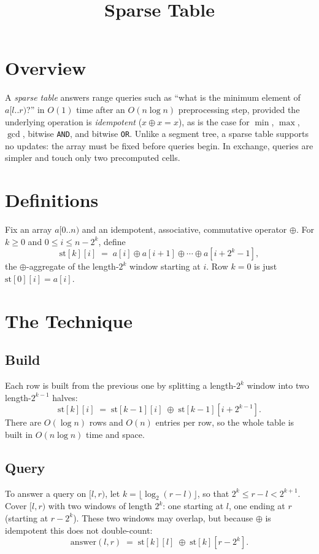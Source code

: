 \documentclass[11pt]{article}
\title{Sparse Table}
\author{}
\date{}
\begin{document}
\thispagestyle{fancy}


\section{Overview}
A \emph{sparse table} answers range queries such as ``what is the minimum
element of $a[l..r)$?'' in $O(1)$ time after an $O(n\log n)$ preprocessing
step, provided the underlying operation is \emph{idempotent}
($x \oplus x = x$), as is the case for $\min$, $\max$, $\gcd$, bitwise
\texttt{AND}, and bitwise \texttt{OR}. Unlike a segment tree, a sparse table
supports no updates: the array must be fixed before queries begin. In
exchange, queries are simpler and touch only two precomputed cells.

\section{Definitions}
\begin{definitionbox}
Fix an array $a[0..n)$ and an idempotent, associative, commutative operator
$\oplus$. For $k \ge 0$ and $0 \le i \le n - 2^k$, define
\[
  \mathrm{st}[k][i] \;=\; a[i] \oplus a[i+1] \oplus \cdots \oplus a[i+2^k-1],
\]
the $\oplus$-aggregate of the length-$2^k$ window starting at $i$. Row $k=0$
is just $\mathrm{st}[0][i] = a[i]$.
\end{definitionbox}

\section{The Technique}

\subsection{Build}
Each row is built from the previous one by splitting a length-$2^k$ window
into two length-$2^{k-1}$ halves:
\[
  \mathrm{st}[k][i] \;=\; \mathrm{st}[k-1][i] \;\oplus\; \mathrm{st}[k-1][i + 2^{k-1}].
\]
There are $O(\log n)$ rows and $O(n)$ entries per row, so the whole table is
built in $O(n \log n)$ time and space.

\subsection{Query}
To answer a query on $[l, r)$, let $k = \lfloor \log_2(r-l) \rfloor$, so that
$2^k \le r - l < 2^{k+1}$. Cover $[l, r)$ with two windows of length $2^k$:
one starting at $l$, one ending at $r$ (starting at $r - 2^k$). These two
windows may overlap, but because $\oplus$ is idempotent this does not
double-count:
\[
  \mathrm{answer}(l, r) \;=\; \mathrm{st}[k][l] \;\oplus\; \mathrm{st}[k][r - 2^k].
\]
\end{document}
